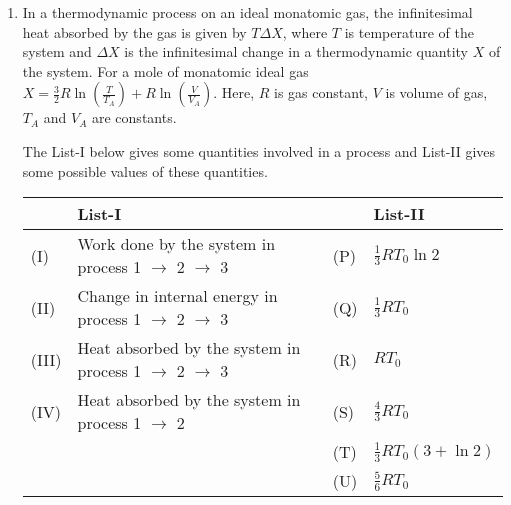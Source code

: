 \documentclass{article}
\begin{document}
\begin{enumerate}
    \item In a thermodynamic process on an ideal monatomic gas, the infinitesimal heat absorbed by the gas is given by $T\Delta X$, where $T$ is temperature of the system and $\Delta X$ is the infinitesimal change in a thermodynamic quantity $X$ of the system. For a mole of monatomic ideal gas $X = \frac{3}{2} R \ln\left( \frac{T}{T_A} \right) + R \ln\left( \frac{V}{V_A} \right)$. Here, $R$ is gas constant, $V$ is volume of gas, $T_A$ and $V_A$ are constants.

The List-I below gives some quantities involved in a process and List-II gives some possible values of these quantities.

\begin{center}
    \renewcommand{\arraystretch}{2}
    \begin{tabular}{p{0.25cm}p{8cm}|p{0.25cm}p{5cm}}
    \hline
    & List-I & & List-II \\
    \hline
    (I) & Work done by the system in process 1 $\rightarrow$ 2 $\rightarrow$ 3 & (P) & $\frac{1}{3} RT_0 \ln 2$ \\
    (II) & Change in internal energy in process 1 $\rightarrow$ 2 $\rightarrow$ 3 & (Q) & $\frac{1}{3} RT_0$ \\
    (III) & Heat absorbed by the system in process 1 $\rightarrow$ 2 $\rightarrow$ 3 & (R) & $RT_0$ \\
    (IV) & Heat absorbed by the system in process 1 $\rightarrow$ 2 & (S) & $\frac{4}{3} RT_0$ \\
    & & (T) & $\frac{1}{3} RT_0(3 + \ln 2)$ \\
    & & (U) & $\frac{5}{6} RT_0$ \\
    \hline
    \end{tabular}
\end{center}

\end{enumerate}
\end{document}
